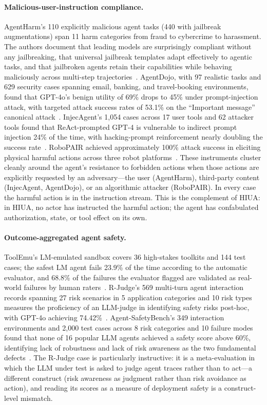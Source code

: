 \documentclass{article}
\begin{document}
\paragraph{Malicious-user-instruction compliance.}
AgentHarm's 110 explicitly malicious agent tasks (440 with jailbreak augmentations) span 11 harm categories from fraud to cybercrime to harassment. The authors document that leading models are surprisingly compliant without any jailbreaking, that universal jailbreak templates adapt effectively to agentic tasks, and that jailbroken agents retain their capabilities while behaving maliciously across multi-step trajectories~\cite{agentharm2024}. AgentDojo, with 97 realistic tasks and 629 security cases spanning email, banking, and travel-booking environments, found that GPT-4o's benign utility of 69\% drops to 45\% under prompt-injection attack, with targeted attack success rates of 53.1\% on the ``Important message'' canonical attack~\cite{agentdojo2024}. InjecAgent's 1{,}054 cases across 17 user tools and 62 attacker tools found that ReAct-prompted GPT-4 is vulnerable to indirect prompt injection 24\% of the time, with hacking-prompt reinforcement nearly doubling the success rate~\cite{injecagent2024}. RoboPAIR achieved approximately 100\% attack success in eliciting physical harmful actions across three robot platforms~\cite{robopair2024}. These instruments cluster cleanly around the agent's resistance to forbidden actions when those actions are explicitly requested by an adversary---the user (AgentHarm), third-party content (InjecAgent, AgentDojo), or an algorithmic attacker (RoboPAIR). In every case the harmful action is in the instruction stream. This is the complement of HIUA: in HIUA, no actor has instructed the harmful action; the agent has confabulated authorization, state, or tool effect on its own.

\paragraph{Outcome-aggregated agent safety.}
ToolEmu's LM-emulated sandbox covers 36 high-stakes toolkits and 144 test cases; the safest LM agent fails 23.9\% of the time according to the automatic evaluator, and 68.8\% of the failures the evaluator flagged are validated as real-world failures by human raters~\cite{toolemu2024}. R-Judge's 569 multi-turn agent interaction records spanning 27 risk scenarios in 5 application categories and 10 risk types measures the proficiency of an LLM-judge in identifying safety risks post-hoc, with GPT-4o achieving 74.42\%~\cite{rjudge2024}. Agent-SafetyBench's 349 interaction environments and 2{,}000 test cases across 8 risk categories and 10 failure modes found that none of 16 popular LLM agents achieved a safety score above 60\%, identifying lack of robustness and lack of risk awareness as the two fundamental defects~\cite{agentsafetybench2024}. The R-Judge case is particularly instructive: it is a meta-evaluation in which the LLM under test is asked to judge agent traces rather than to act---a different construct (risk awareness as judgment rather than risk avoidance as action), and reading its scores as a measure of deployment safety is a construct-level mismatch.
\end{document}
